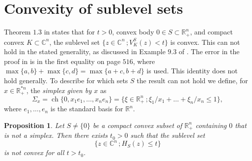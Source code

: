 \documentclass[a4paper,12pt,leqno,english]{article}
\numberwithin{equation}{section}
\newtheorem{proposition+}  [theorem+]  {Proposition}
\newenvironment{proposition}{\begin{proposition+}\sl}{\end{proposition+}\rm}
\begin{document}
\section{Convexity of sublevel sets}
Theorem $1.3$ in \cite{NguTan:2021} states that for
    $t > 0$,
    convex body $0 \in S \subset \mathbb{R}^n_+$, and
    compact convex $K \subset \mathbb{C}^n$,
    the sublevel set $\{z \in \mathbb{C}^n \,; V^S_K(z) < t\}$ is convex.
This can not hold in the stated generality, as discussed in Example $9.3$ of \cite{MagSigSigSno:2023}.
The error in the proof in \cite{NguTan:2021} is in the first equality on page $516$,
    where $\max\{a, b\} + \max\{c, d\} = \max\{a + c, b + d\}$ is used.
This identity does not hold generally.
To describe for which sets $S$ the result can not hold we define, for $x \in \mathbb{R}^{*n}_+$, the \emph{simplex given by $x$} as
\begin{equation*}
    \Sigma_x
    =
    \operatorname{ch}\{0, x_1 e_1, \dots, x_n e_n\}
    =
    \{\xi \in \mathbb{R}^n_+ \,; \xi_1/x_1 + \dots + \xi_n/x_n \leq 1\},
\end{equation*}
where $e_1, \dots, e_n$ is the standard basis for $\mathbb{R}^n$.
\begin{proposition}
    Let $S \neq \{0\}$ be a compact convex subset of $\mathbb{R}^n_+$ containing $0$ that is not a simplex.
    Then there exists $t_0 > 0$ such that the sublevel set
\begin{equation*}
    \{z \in \mathbb{C}^n \,; H_S(z) \leq t\}
\end{equation*}
is not convex for all $t > t_0$. 
\end{proposition}
\end{document}
